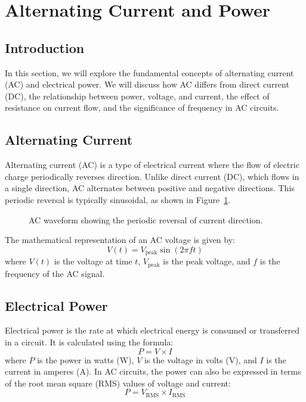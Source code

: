 \section{Alternating Current and Power}
\label{section:alternating_current_and_power}

\subsection*{Introduction}
In this section, we will explore the fundamental concepts of alternating current (AC) and electrical power. We will discuss how AC differs from direct current (DC), the relationship between power, voltage, and current, the effect of resistance on current flow, and the significance of frequency in AC circuits.

\subsection*{Alternating Current}
Alternating current (AC) is a type of electrical current where the flow of electric charge periodically reverses direction. Unlike direct current (DC), which flows in a single direction, AC alternates between positive and negative directions. This periodic reversal is typically sinusoidal, as shown in Figure~\ref{fig:ac_waveform}.

\begin{figure}[h]
    \centering
    \caption{AC waveform showing the periodic reversal of current direction.}
    \label{fig:ac_waveform}
\end{figure}

The mathematical representation of an AC voltage is given by:
\begin{equation}
    V(t) = V_{\text{peak}} \sin(2\pi f t)
\end{equation}
where \( V(t) \) is the voltage at time \( t \), \( V_{\text{peak}} \) is the peak voltage, and \( f \) is the frequency of the AC signal.

\subsection*{Electrical Power}
Electrical power is the rate at which electrical energy is consumed or transferred in a circuit. It is calculated using the formula:
\begin{equation}
    P = V \times I
\end{equation}
where \( P \) is the power in watts (W), \( V \) is the voltage in volts (V), and \( I \) is the current in amperes (A). In AC circuits, the power can also be expressed in terms of the root mean square (RMS) values of voltage and current:
\begin{equation}
    P = V_{\text{RMS}} \times I_{\text{RMS}}
\end{equation}

